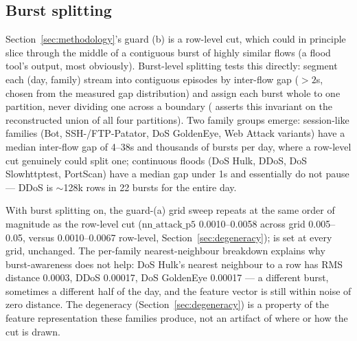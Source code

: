 \subsection{Burst splitting}
Section~\ref{sec:methodology}'s guard (b) is a row-level cut, which could in principle slice
through the middle of a contiguous burst of highly similar flows (a flood tool's output, most
obviously). Burst-level splitting tests this directly: segment each (day, family) stream into
contiguous episodes by inter-flow gap ($>2$s, chosen from the measured gap distribution) and
assign each burst whole to one partition, never dividing one across a boundary
( asserts this invariant on the reconstructed union of all four
partitions). Two family groups emerge: session-like families (Bot, SSH-/FTP-Patator, DoS
GoldenEye, Web Attack variants) have a median inter-flow gap of 4--38s and thousands of bursts
per day, where a row-level cut genuinely could split one; continuous floods (DoS Hulk, DDoS, DoS
Slowhttptest, PortScan) have a median gap under 1s and essentially do not pause — DDoS is
$\sim$128k rows in 22 bursts for the entire day.

With burst splitting on, the guard-(a) grid sweep repeats at the same order of magnitude as the
row-level cut ($\text{nn\_attack\_p5}$ 0.0010--0.0058 across grid 0.005--0.05, versus 0.0010--0.0067
row-level, Section~\ref{sec:degeneracy});  is set at every grid, unchanged.
The per-family nearest-neighbour breakdown explains why burst-awareness does not help: DoS
Hulk's nearest  neighbour to a  row has RMS distance
0.0003, DDoS 0.00017, DoS GoldenEye 0.00017 — a different burst, sometimes a different half of
the day, and the feature vector is still within noise of zero distance. The degeneracy
(Section~\ref{sec:degeneracy}) is a property of the feature representation these families
produce, not an artifact of where or how the cut is drawn.

